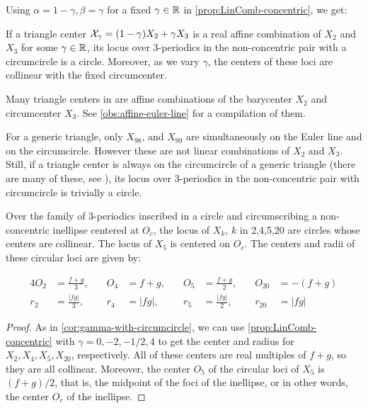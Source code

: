 Using $\alpha=1-\gamma, \beta=\gamma$ for a fixed $\gamma\in\mathbb{R}$ in   \cref{prop:LinComb-concentric}, we get:

\begin{corollary}
 If a triangle center $\mathcal{X}_\gamma=(1-\gamma) X_2+ \gamma X_3$ is a real affine combination of $X_2$ and $X_3$ for some $\gamma\in\mathbb{R}$, its locus over 3-periodics in the non-concentric pair with a circumcircle is a circle. Moreover, as we vary $\gamma$, the centers of these loci are collinear with the fixed circumcenter.
 \label{cor:gamma-with-circumcircle}
\end{corollary}

Many triangle centers in \cite{etc} are affine combinations of the barycenter $X_2$ and circumcenter $X_3$. See   \cref{obs:affine-euler-line} for a compilation of them.

\begin{observation}
For a generic triangle, only $X_{98}$, and $X_{99}$ are simultaneously on the Euler line and on the circumcircle. However these are not linear combinations of $X_2$ and $X_3$. Still, if a triangle center is always on the circumcircle of a generic triangle (there are many of these, see \cite[Circumcircle]{mw}), its locus over 3-periodics in the non-concentric pair with circumcircle is trivially a circle.
\end{observation}

 
\begin{corollary}
 Over the family of 3-periodics inscribed in a circle and circumscribing a non-concentric inellipse centered at $O_c$, the locus of $X_k$, $k$ in 2,4,5,20 are circles whose centers are collinear. The locus of $X_5$ is centered on $O_c$. The centers and radii of these circular loci are given by:

\begin{alignat*}{4}
    O_2&=\frac{f+g}{3},\quad& O_4&=f+g,\quad&O_5&=\frac{f+g}{2},\quad&O_{20}&=-(f+g)\\
    r_2&=\frac{|f g|}{3},\quad&r_4 &= |f g|,\quad&r_5 &= \frac{|f g|}{2},\quad& r_{20}&= |f g|
\end{alignat*}

\end{corollary}

\begin{proof}
As in  \cref{cor:gamma-with-circumcircle}, we can use  \cref{prop:LinComb-concentric} with $\gamma=0,-2,-1/2,4$ to get the center and radius for $X_2,X_4,X_5,X_{20}$, respectively. All of these centers are real multiples of $f+g$, so they are all collinear. Moreover, the center $O_5$ of the circular loci of $X_5$ is $(f+g)/2$, that is, the midpoint of the foci of the inellipse, or in other words, the center $O_c$ of the inellipse.
\end{proof}
 
